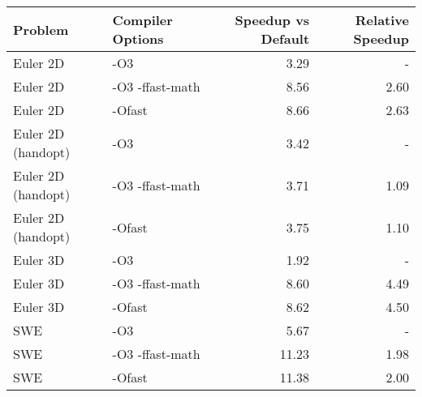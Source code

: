 \begin{tabular}{llrr}
\toprule
Problem & Compiler Options & Speedup vs Default & Relative Speedup \\
\midrule
Euler 2D & -O3 & 3.29 & - \\
Euler 2D & -O3 -ffast-math & 8.56 & 2.60 \\
Euler 2D & -Ofast & 8.66 & 2.63 \\
Euler 2D (handopt) & -O3 & 3.42 & - \\
Euler 2D (handopt) & -O3 -ffast-math & 3.71 & 1.09 \\
Euler 2D (handopt) & -Ofast & 3.75 & 1.10 \\
Euler 3D & -O3 & 1.92 & - \\
Euler 3D & -O3 -ffast-math & 8.60 & 4.49 \\
Euler 3D & -Ofast & 8.62 & 4.50 \\
SWE & -O3 & 5.67 & - \\
SWE & -O3 -ffast-math & 11.23 & 1.98 \\
SWE & -Ofast & 11.38 & 2.00 \\
\bottomrule
\end{tabular}
